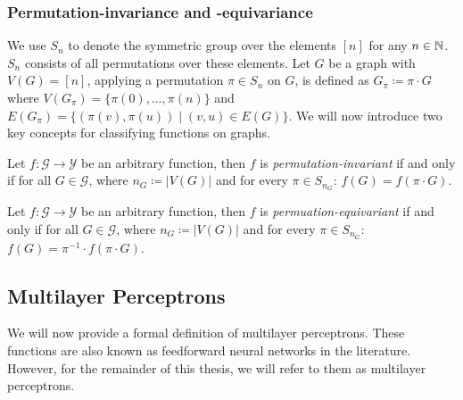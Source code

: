 \subsubsection{Permutation-invariance and -equivariance}
We use $S_n$ to denote the symmetric group over the elements $[n]$ for any $n \in \mathbb{N}$. $S_n$ consists of all permutations over these elements. Let $G$ be a graph with $V(G) = [n]$, applying a permutation $\pi \in S_n$ on $G$, is defined as $G_\pi \coloneqq \pi \cdot G$ where $V(G_\pi) = \{\pi(0), \ldots, \pi(n) \}$ and $E(G_\pi) = \{ (\pi(v), \pi(u)) \mid (v,u) \in E(G)\}$. We will now introduce two key concepts for classifying functions on graphs.

\begin{definition}
    Let $f: \mathcal{G} \rightarrow \mathcal{Y}$ be an arbitrary function, then $f$ is \textit{permutation-invariant} if and only if for all $G \in \mathcal{G}$, where $n_G \coloneqq |V(G)|$ and for every $\pi \in S_{n_G}$: $f(G) = f(\pi \cdot G)$.
\end{definition}

\begin{definition}
    Let $f: \mathcal{G} \rightarrow \mathcal{Y}$ be an arbitrary function, then $f$ is \textit{permuation-equivariant} if and only if for all $G \in \mathcal{G}$, where $n_G \coloneqq |V(G)|$ and for every $\pi \in S_{n_G}$: $f(G) = \pi^{-1} \cdot f(\pi \cdot G)$.
\end{definition}

\subsection{Multilayer Perceptrons}
We will now provide a formal definition of multilayer perceptrons. These functions are also known as feedforward neural networks in the literature. However, for the remainder of this thesis, we will refer to them as multilayer perceptrons.

